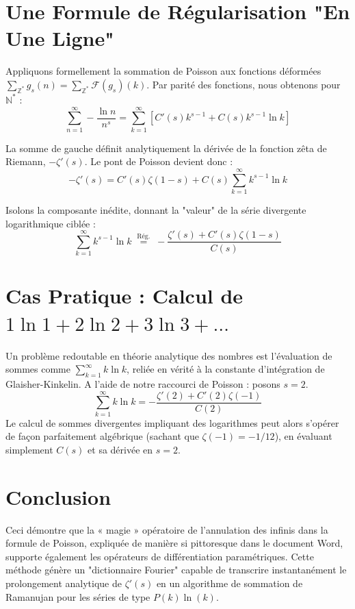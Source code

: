 \documentclass[12pt,a4paper]{article}
\begin{document}
\section{Une Formule de Régularisation "En Une Ligne"}
Appliquons formellement la sommation de Poisson aux fonctions déformées $\sum_{\mathbb{Z}^*} g_s(n) = \sum_{\mathbb{Z}^*} \mathcal{F}(g_s)(k)$. Par parité des fonctions, nous obtenons pour $\mathbb{N}^*$ :
\begin{equation}
    \sum_{n=1}^\infty -\frac{\ln n}{n^s} = \sum_{k=1}^\infty \left[ C'(s) k^{s-1} + C(s) k^{s-1} \ln k \right]
\end{equation}

La somme de gauche définit analytiquement la dérivée de la fonction zêta de Riemann, $-\zeta'(s)$. Le pont de Poisson devient donc :
\begin{equation}
    -\zeta'(s) = C'(s) \zeta(1-s) + C(s) \sum_{k=1}^\infty k^{s-1} \ln k
\end{equation}

Isolons la composante inédite, donnant la "valeur" de la série divergente logarithmique ciblée :
\begin{equation} \label{eq:master_div}
    \sum_{k=1}^\infty k^{s-1} \ln k \;\overset{\text{Rég.}}{=}\; - \frac{\zeta'(s) + C'(s)\zeta(1-s)}{C(s)}
\end{equation}

\section{Cas Pratique : Calcul de $1 \ln 1 + 2 \ln 2 + 3 \ln 3 + \dots$}
Un problème redoutable en théorie analytique des nombres est l'évaluation de sommes comme $\sum_{k=1}^\infty k \ln k$, reliée en vérité à la constante d'intégration de Glaisher-Kinkelin.
A l'aide de notre raccourci de Poisson : posons $s=2$. 
\begin{equation}
    \sum_{k=1}^\infty k \ln k = - \frac{\zeta'(2) + C'(2)\zeta(-1)}{C(2)}
\end{equation}
Le calcul de sommes divergentes impliquant des logarithmes peut alors s'opérer de façon parfaitement algébrique (sachant que $\zeta(-1) = -1/12$), en évaluant simplement $C(s)$ et sa dérivée en $s=2$.

\section{Conclusion}
Ceci démontre que la « magie » opératoire de l'annulation des infinis dans la formule de Poisson, expliquée de manière si pittoresque dans le document Word, supporte également les opérateurs de différentiation paramétriques. Cette méthode génère un "dictionnaire Fourier" capable de transcrire instantanément le prolongement analytique de $\zeta'(s)$ en un algorithme de sommation de Ramanujan pour les séries de type $P(k)\ln(k)$.
\end{document}
